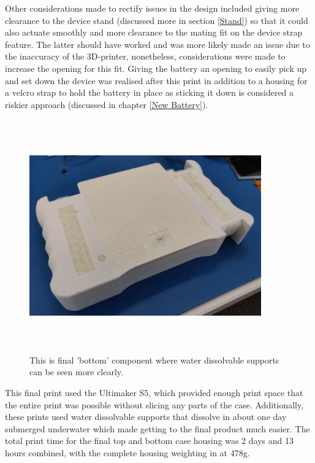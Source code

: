 Other considerations made to rectify issues in the design included giving more clearance to the device stand (discussed more in section \ref{Stand}) so that it could also actuate smoothly and more clearance to the mating fit on the device strap feature.
The latter should have worked and was more likely made an issue due to the inaccuracy of the 3D-printer, nonetheless, considerations were made to increase the opening for this fit.
Giving the battery an opening to easily pick up and set down the device was realised after this print in addition to a housing for a velcro strap to hold the battery in place as sticking it down is considered a riskier approach (discussed in chapter \ref{New Battery}).

\begin{figure} [h]
    \centering
    \includegraphics[width=10cm,height=10cm,keepaspectratio]{Figures/bottomwatersupport.png}
    \caption{This is final 'bottom' component where water dissolvable supports can be seen more clearly.}
    \label{fig:thirdbottom}
\end{figure}

This final print used the Ultimaker S5, which provided enough print space that the entire print was possible without slicing any parts of the case.
Additionally, these prints used water dissolvable supports that dissolve in about one day submerged underwater which made getting to the final product much easier.
The total print time for the final top and bottom case housing was 2 days and 13 hours combined, with the complete housing weighting in at 478g.

